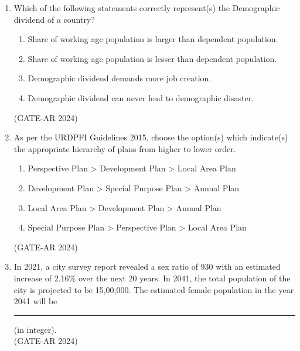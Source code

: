 \documentclass[a4paper,10pt]{article}
\begin{document}
\begin{enumerate}
    \item Which of the following statements correctly represent(s) the Demographic dividend of a country?
    \begin{enumerate}
        \item Share of working age population is larger than dependent population.
        \item Share of working age population is lesser than dependent population.
        \item Demographic dividend demands more job creation.
        \item Demographic dividend can never lead to demographic disaster.
    \end{enumerate}
    \hfill (GATE-AR 2024)

    \item As per the URDPFI Guidelines 2015, choose the option(s) which indicate(s) the appropriate hierarchy of plans from higher to lower order.
    \begin{enumerate}
        \item Perspective Plan > Development Plan > Local Area Plan
        \item Development Plan > Special Purpose Plan > Annual Plan
        \item Local Area Plan > Development Plan > Annual Plan
        \item Special Purpose Plan > Perspective Plan > Local Area Plan
    \end{enumerate}
    \hfill (GATE-AR 2024)

    \item In 2021, a city survey report revealed a sex ratio of 930 with an estimated increase of 2.16\% over the next 20 years. In 2041, the total population of the city is projected to be 15,00,000. The estimated female population in the year 2041 will be \rule{2cm}{0.4pt} (in integer). \\
    \hfill (GATE-AR 2024)


\end{enumerate}
\end{document}
